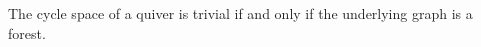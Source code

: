 \begin{corollary}\label{Arden24A-cor-3.2}
\label{Arden24A-cor:forest}
The cycle space of a quiver is trivial if and only if the underlying graph is a forest.
\end{corollary}